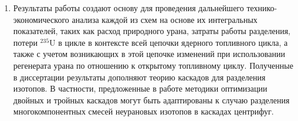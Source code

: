 \begin{enumerate}[label=\Roman*.]
\item Результаты работы создают основу для проведения дальнейшего технико-экономического анализа каждой из схем на основе их интегральных показателей, таких как расход природного урана, затраты работы разделения, потери $^{235}$U в цикле в контексте всей цепочки ядерного топливного цикла, а также с учетом возникающих в этой цепочке изменений при использовании регенерата урана по отношению к открытому топливному циклу. Полученные в диссертации результаты дополняют теорию каскадов для разделения изотопов. В частности, предложенные в работе методики оптимизации двойных и тройных каскадов могут быть адаптированы к случаю разделения многокомпонентных смесей неурановых изотопов в каскадах центрифуг.

\end{enumerate}
